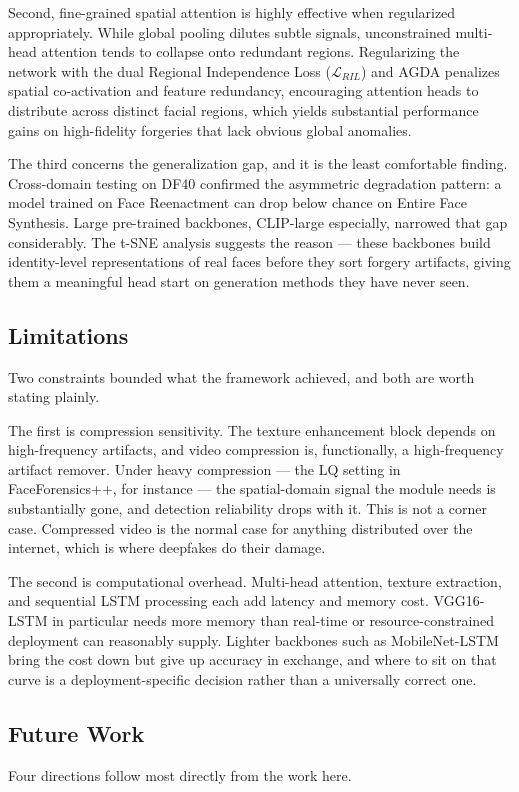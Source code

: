 Second, fine-grained spatial attention is highly effective when regularized appropriately. While global pooling dilutes subtle signals, unconstrained multi-head attention tends to collapse onto redundant regions. Regularizing the network with the dual Regional Independence Loss ($\mathcal{L}_{RIL}$) and AGDA penalizes spatial co-activation and feature redundancy, encouraging attention heads to distribute across distinct facial regions, which yields substantial performance gains on high-fidelity forgeries that lack obvious global anomalies.

The third concerns the generalization gap, and it is the least comfortable finding. Cross-domain testing on DF40 confirmed the asymmetric degradation pattern: a model trained on Face Reenactment can drop below chance on Entire Face Synthesis. Large pre-trained backbones, CLIP-large especially, narrowed that gap considerably. The t-SNE analysis suggests the reason — these backbones build identity-level representations of real faces before they sort forgery artifacts, giving them a meaningful head start on generation methods they have never seen.

\subsection{Limitations}
Two constraints bounded what the framework achieved, and both are worth stating plainly.

The first is compression sensitivity. The texture enhancement block depends on high-frequency artifacts, and video compression is, functionally, a high-frequency artifact remover. Under heavy compression — the LQ setting in FaceForensics++, for instance — the spatial-domain signal the module needs is substantially gone, and detection reliability drops with it. This is not a corner case. Compressed video is the normal case for anything distributed over the internet, which is where deepfakes do their damage.

The second is computational overhead. Multi-head attention, texture extraction, and sequential LSTM processing each add latency and memory cost. VGG16-LSTM in particular needs more memory than real-time or resource-constrained deployment can reasonably supply. Lighter backbones such as MobileNet-LSTM bring the cost down but give up accuracy in exchange, and where to sit on that curve is a deployment-specific decision rather than a universally correct one.

\subsection{Future Work}
Four directions follow most directly from the work here.

